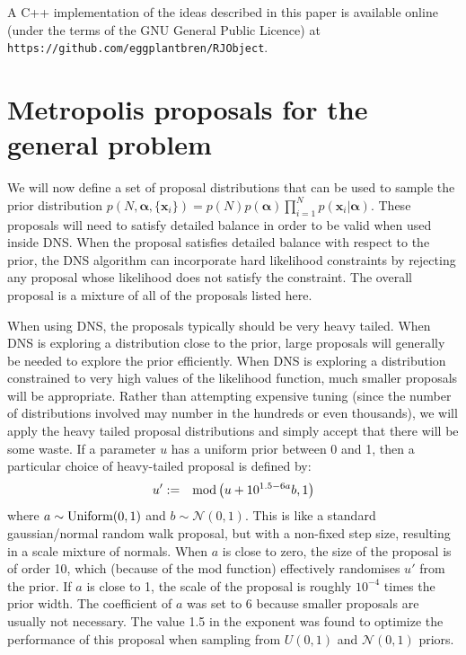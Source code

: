 \documentclass[letterpaper, 11pt]{article}
\newcommand{\hyperparams}{\boldsymbol{\alpha}}
\newcommand{\xx}{\mathbf{x}}
\begin{document}
A C++ implementation of the ideas described in this paper is available online
(under the terms of the GNU General Public Licence) at
{\tt https://github.com/eggplantbren/RJObject}.



\section{Metropolis proposals for the general problem}\label{sec:proposals}
We will now define a set of proposal distributions that can be used to
sample the prior distribution
$p(N, \hyperparams, \{\xx_i\}) = p(N) p(\hyperparams) \prod_{i=1}^N p(\xx_i | \hyperparams)$.
These proposals will need to satisfy detailed balance in order to be valid
when used inside DNS. When the proposal satisfies detailed balance with respect
to the prior, the DNS algorithm can incorporate hard likelihood constraints by
rejecting any proposal whose likelihood does not satisfy the constraint.
The overall proposal is a mixture of all of the proposals listed here.

When using DNS,
the proposals typically should be very heavy tailed. When
DNS is exploring a distribution close to the prior, large proposals will
generally be needed to explore the prior efficiently.
When DNS is exploring a distribution constrained to
very high values of the likelihood function, much smaller proposals will be
appropriate. Rather than attempting expensive tuning (since the number of
distributions involved may number in the hundreds or even thousands), we will
apply the heavy tailed proposal distributions and simply accept that there will
be some waste. If a parameter $u$ has a uniform prior between 0 and 1, then
a particular choice of heavy-tailed proposal is defined by:
\begin{eqnarray}
u' &:=& \textnormal{mod}\left(u + 10^{1.5 - 6a}b, 1\right)\label{eqn:heavytailed}
\end{eqnarray}
where $a \sim \textnormal{Uniform}(0, 1)$ and $b\sim \mathcal{N}(0,1)$.
This is like a standard gaussian/normal random walk proposal, but with a
non-fixed step size, resulting in a scale mixture of normals.
When
$a$ is close to zero, the size of the proposal is of order 10, which (because
of the mod function) effectively randomises $u'$ from the prior. If $a$ is
close to 1, the scale of the proposal is roughly $10^{-4}$ times the prior
width. The coefficient of $a$ was set to 6 because smaller proposals are
usually not necessary. The value 1.5 in the exponent was found to optimize the
performance of this proposal when sampling from $U(0, 1)$ and $\mathcal{N}(0,1)$
priors.
\end{document}
